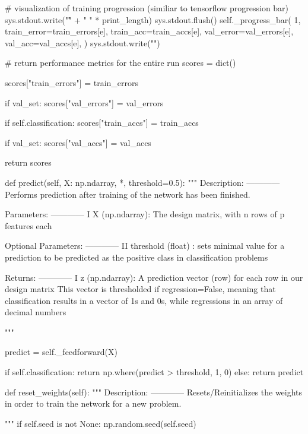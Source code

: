 \documentclass[%
oneside,                 %
final,                   %
10pt]{article}
\begin{document}
        # visualization of training progression (similiar to tensorflow progression bar)
        sys.stdout.write("\r" + " " * print_length)
        sys.stdout.flush()
        self._progress_bar(
            1,
            train_error=train_errors[e],
            train_acc=train_accs[e],
            val_error=val_errors[e],
            val_acc=val_accs[e],
        )
        sys.stdout.write("")

        # return performance metrics for the entire run
        scores = dict()

        scores["train_errors"] = train_errors

        if val_set:
            scores["val_errors"] = val_errors

        if self.classification:
            scores["train_accs"] = train_accs

            if val_set:
                scores["val_accs"] = val_accs

        return scores

    def predict(self, X: np.ndarray, *, threshold=0.5):
        """
         Description:
         ------------
             Performs prediction after training of the network has been finished.

         Parameters:
        ------------
             I   X (np.ndarray): The design matrix, with n rows of p features each

         Optional Parameters:
         ------------
             II  threshold (float) : sets minimal value for a prediction to be predicted as the positive class
                 in classification problems

         Returns:
         ------------
             I   z (np.ndarray): A prediction vector (row) for each row in our design matrix
                 This vector is thresholded if regression=False, meaning that classification results
                 in a vector of 1s and 0s, while regressions in an array of decimal numbers

        """

        predict = self._feedforward(X)

        if self.classification:
            return np.where(predict > threshold, 1, 0)
        else:
            return predict

    def reset_weights(self):
        """
        Description:
        ------------
            Resets/Reinitializes the weights in order to train the network for a new problem.

        """
        if self.seed is not None:
            np.random.seed(self.seed)
\end{document}
